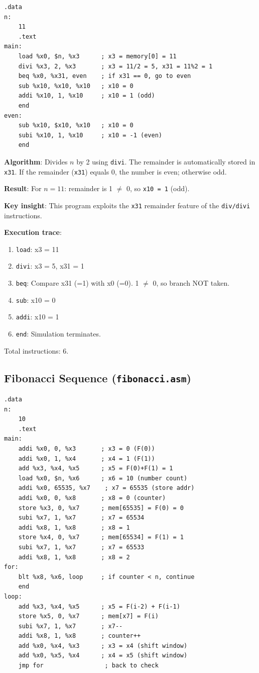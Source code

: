 \documentclass[12pt,a4paper]{article}
\begin{document}
\begin{lstlisting}[style=asmstyle, caption={evenorodd.asm}]
    .data
n:
    11
    .text
main:
    load %x0, $n, %x3      ; x3 = memory[0] = 11
    divi %x3, 2, %x3       ; x3 = 11/2 = 5, x31 = 11%2 = 1
    beq %x0, %x31, even    ; if x31 == 0, go to even
    sub %x10, %x10, %x10   ; x10 = 0
    addi %x10, 1, %x10     ; x10 = 1 (odd)
    end
even:
    sub %x10, $x10, %x10   ; x10 = 0
    subi %x10, 1, %x10     ; x10 = -1 (even)
    end
\end{lstlisting}

\textbf{Algorithm}: Divides $n$ by 2 using \texttt{divi}. The remainder is automatically stored in \texttt{x31}. If the remainder (\texttt{x31}) equals 0, the number is even; otherwise odd.

\textbf{Result}: For $n = 11$: remainder is 1 $\neq$ 0, so \texttt{x10 = 1} (odd).

\textbf{Key insight}: This program exploits the \texttt{x31} remainder feature of the \texttt{div/divi} instructions.

\textbf{Execution trace}:
\begin{enumerate}
    \item \texttt{load}: x3 = 11
    \item \texttt{divi}: x3 = 5, x31 = 1
    \item \texttt{beq}: Compare x31 (=1) with x0 (=0). 1 $\neq$ 0, so branch NOT taken.
    \item \texttt{sub}: x10 = 0
    \item \texttt{addi}: x10 = 1
    \item \texttt{end}: Simulation terminates.
\end{enumerate}

Total instructions: 6.

\subsection{Fibonacci Sequence (\texttt{fibonacci.asm})}

\begin{lstlisting}[style=asmstyle, caption={fibonacci.asm}]
.data
n:
    10
    .text
main:
    addi %x0, 0, %x3       ; x3 = 0 (F(0))
    addi %x0, 1, %x4       ; x4 = 1 (F(1))
    add %x3, %x4, %x5      ; x5 = F(0)+F(1) = 1
    load %x0, $n, %x6      ; x6 = 10 (number count)
    addi %x0, 65535, %x7    ; x7 = 65535 (store addr)
    addi %x0, 0, %x8       ; x8 = 0 (counter)
    store %x3, 0, %x7      ; mem[65535] = F(0) = 0
    subi %x7, 1, %x7       ; x7 = 65534
    addi %x8, 1, %x8       ; x8 = 1
    store %x4, 0, %x7      ; mem[65534] = F(1) = 1
    subi %x7, 1, %x7       ; x7 = 65533
    addi %x8, 1, %x8       ; x8 = 2
for:
    blt %x8, %x6, loop     ; if counter < n, continue
    end
loop:
    add %x3, %x4, %x5      ; x5 = F(i-2) + F(i-1)
    store %x5, 0, %x7      ; mem[x7] = F(i)
    subi %x7, 1, %x7       ; x7--
    addi %x8, 1, %x8       ; counter++
    add %x0, %x4, %x3      ; x3 = x4 (shift window)
    add %x0, %x5, %x4      ; x4 = x5 (shift window)
    jmp for                 ; back to check
\end{lstlisting}
\end{document}
